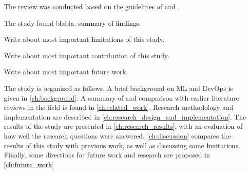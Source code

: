 The review was conducted based on the guidelines of \cite{Kitchenham07guidelinesfor} and \cite{Wohlin2014}.

The study found blabla, summary of findings.

Write about most important limitations of this study.

Write about most important contribution of this study.

Write about most important future work.

The study is organized as follows.
A brief background on ML and DevOps is given in \cref{ch:background}.
A summary of and comparison with earlier literature reviews in the field is found in \cref{ch:related_work}.
Research methodology and implementation are described in \cref{ch:research_design_and_implementation}.
The results of the study are presented in \cref{ch:research_results}, with an evaluation of how well the research questions were answered.
\cref{ch:discussion} compares the results of this study with previous work, as well as discussing some limitations.
Finally, some directions for future work and research are proposed in \cref{ch:future_work}